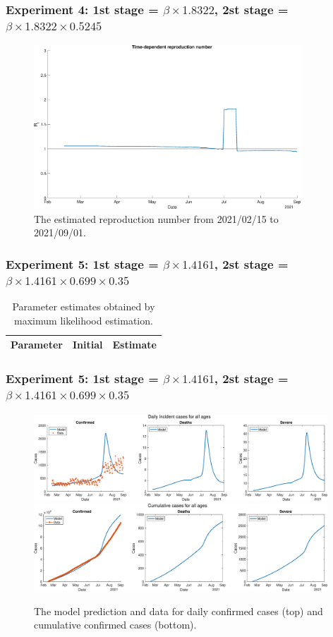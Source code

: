 \documentclass[aspectratio=169, 9pt, xcolor=dvipsnames]{beamer}
\begin{document}
	\begin{frame}\frametitle{Experiment 4: 1st stage = $\beta \times 1.8322$, 2st stage = $\beta \times 1.8322 \times 0.5245$}
	    \begin{figure}
	    	\centering
	    	\includegraphics[width=10cm]{../results/estimate_sd_1st_1_2nd_4/rep_num.eps}
	    	\caption{The estimated reproduction number from 2021/02/15 to 2021/09/01.}
	    \end{figure}
	\end{frame}

	\begin{frame}\frametitle{Experiment 5: 1st stage = $\beta \times 1.4161$, 2st stage = $\beta \times 1.4161 \times 0.699 \times 0.35$}
	    \begin{table}
	    	\begin{tabular}{crr}
	    		\toprule
	    		\textbf{Parameter} & \textbf{Initial} & \textbf{Estimate} \\
	    		\midrule
	    		
	    		\bottomrule
	    	\end{tabular}
	    	\caption{Parameter estimates obtained by maximum likelihood estimation.}
	    \end{table}
	\end{frame}

	\begin{frame}\frametitle{Experiment 5: 1st stage = $\beta \times 1.4161$, 2st stage = $\beta \times 1.4161 \times 0.699 \times 0.35$}
	    \begin{figure}
	    	\centering
	    	\includegraphics[width=11cm]{../results/estimate_sd_1st_2_2nd_1/daily_all_age.eps}
	    	\includegraphics[width=11cm]{../results/estimate_sd_1st_2_2nd_1/cumul_all_age.eps}
	    	\caption{The model prediction and data for daily confirmed cases (top) and cumulative confirmed cases (bottom).}
	    \end{figure}
	\end{frame}
\end{document}
